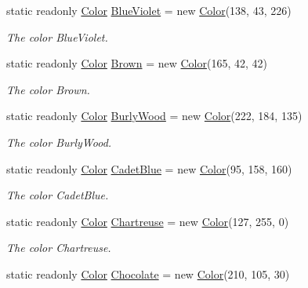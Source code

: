 \begin{DoxyCompactItemize}
static readonly \hyperlink{struct_tri_devs_1_1_tri_engine2_d_1_1_color}{Color} \hyperlink{struct_tri_devs_1_1_tri_engine2_d_1_1_color_a35423e3e26f4ac879e692194056a1271}{Blue\-Violet} = new \hyperlink{struct_tri_devs_1_1_tri_engine2_d_1_1_color}{Color}(138, 43, 226)
\begin{DoxyCompactList}\small\item\em The color Blue\-Violet. \end{DoxyCompactList}\item 
static readonly \hyperlink{struct_tri_devs_1_1_tri_engine2_d_1_1_color}{Color} \hyperlink{struct_tri_devs_1_1_tri_engine2_d_1_1_color_a1c75f1b8c0170cf41a94f5df64fe2dfc}{Brown} = new \hyperlink{struct_tri_devs_1_1_tri_engine2_d_1_1_color}{Color}(165, 42, 42)
\begin{DoxyCompactList}\small\item\em The color Brown. \end{DoxyCompactList}\item 
static readonly \hyperlink{struct_tri_devs_1_1_tri_engine2_d_1_1_color}{Color} \hyperlink{struct_tri_devs_1_1_tri_engine2_d_1_1_color_a5fa527012c166c88c412c02ad9722502}{Burly\-Wood} = new \hyperlink{struct_tri_devs_1_1_tri_engine2_d_1_1_color}{Color}(222, 184, 135)
\begin{DoxyCompactList}\small\item\em The color Burly\-Wood. \end{DoxyCompactList}\item 
static readonly \hyperlink{struct_tri_devs_1_1_tri_engine2_d_1_1_color}{Color} \hyperlink{struct_tri_devs_1_1_tri_engine2_d_1_1_color_ae16d655a65d6c625537449b1ec4924e3}{Cadet\-Blue} = new \hyperlink{struct_tri_devs_1_1_tri_engine2_d_1_1_color}{Color}(95, 158, 160)
\begin{DoxyCompactList}\small\item\em The color Cadet\-Blue. \end{DoxyCompactList}\item 
static readonly \hyperlink{struct_tri_devs_1_1_tri_engine2_d_1_1_color}{Color} \hyperlink{struct_tri_devs_1_1_tri_engine2_d_1_1_color_a155d33448ef0bb8fe0267b9219e0fc62}{Chartreuse} = new \hyperlink{struct_tri_devs_1_1_tri_engine2_d_1_1_color}{Color}(127, 255, 0)
\begin{DoxyCompactList}\small\item\em The color Chartreuse. \end{DoxyCompactList}\item 
static readonly \hyperlink{struct_tri_devs_1_1_tri_engine2_d_1_1_color}{Color} \hyperlink{struct_tri_devs_1_1_tri_engine2_d_1_1_color_affde6ccebba274eac5a5e853b9c4508e}{Chocolate} = new \hyperlink{struct_tri_devs_1_1_tri_engine2_d_1_1_color}{Color}(210, 105, 30)

\end{DoxyCompactItemize}
